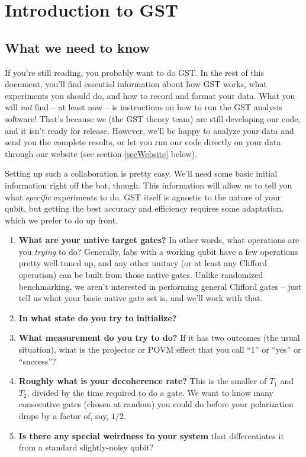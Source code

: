 \documentclass{article}[11pt]
\begin{document}
\clearpage

\section{Introduction to GST}

\subsection{What we need to know}

If you're still reading, you probably want to do GST.  In the rest of this document, you'll find essential information about how GST works, what experiments you should do, and how to record and format your data.  What you will \emph{not} find -- at least now -- is instructions on how to run the GST analysis software!  That's because we (the GST theory team) are still developing our code, and it isn't ready for release.  However, we'll be happy to analyze your data and send you the complete results, or let you run our code directly on your data through our website (see section \ref{secWebsite} below).

Setting up such a collaboration is pretty easy.  We'll need some basic initial information right off the bat, though.  This information will allow us to tell you what \emph{specific} experiments to do.  GST itself is agnostic to the nature of your qubit, but getting the best accuracy and efficiency requires some adaptation, which we prefer to do up front.
\begin{enumerate}
\item \textbf{What are your native target gates?}  In other words, what operations are you \emph{trying} to do?  Generally, labs with a working qubit have a few operations pretty well tuned up, and any other unitary (or at least any Clifford operation) can be built from those native gates.  Unlike randomized benchmarking, we aren't interested in performing general Clifford gates -- just tell us what your basic native gate set is, and we'll work with that.  
\item \textbf{In what state do you try to initialize?}
\item \textbf{What measurement do you try to do?}  If it has two outcomes (the usual situation), what is the projector or POVM effect that you call ``1'' or ``yes'' or ``success''?
\item \textbf{Roughly what is your decoherence rate?}  This is the smaller of $T_1$ and $T_2$, divided by the time required to do a gate.  We want to know many consecutive gates (chosen at random) you could do before your polarization drops by a factor of, say, $1/2$.
\item \textbf{Is there any special weirdness to your system} that differentiates it from a standard slightly-noisy qubit?
\end{enumerate}
\end{document}
